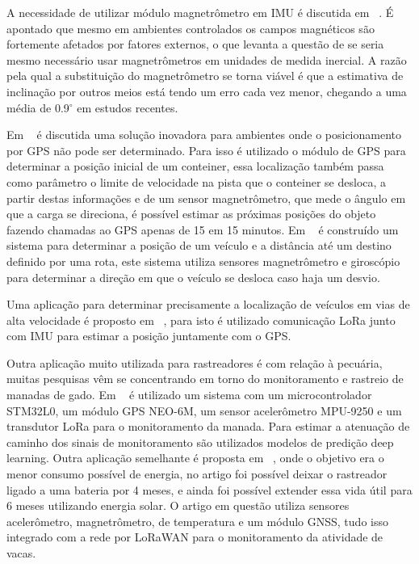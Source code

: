 A necessidade de utilizar módulo magnetrômetro em IMU é discutida em ~\cite{weygers2023}. É apontado que mesmo em ambientes controlados os campos magnéticos são fortemente afetados por fatores externos, o que levanta a questão de se seria mesmo necessário usar magnetrômetros em unidades de medida inercial. A razão pela qual a substituição do magnetrômetro se torna viável é que a estimativa de inclinação por outros meios está tendo um erro cada vez menor, chegando a uma média de 0.9$^{\circ}$ em estudos recentes.

Em ~\cite{huang2023} é discutida uma solução inovadora para ambientes onde o posicionamento por GPS não pode ser determinado. Para isso é utilizado o módulo de GPS para determinar a posição inicial de um conteiner, essa localização também passa como parâmetro o limite de velocidade na pista que o conteiner se desloca, a partir destas informações e de um sensor magnetrômetro, que mede o ângulo em que a carga se direciona, é possível estimar as próximas posições do objeto fazendo chamadas ao GPS apenas de 15 em 15 minutos. Em ~\cite{thuong2010} é construído um sistema para determinar a posição de um veículo e a distância até um destino definido por uma rota, este sistema utiliza sensores magnetrômetro e giroscópio para determinar a direção em que o veículo se desloca caso haja um desvio.

Uma aplicação para determinar precisamente a localização de veículos em vias de alta velocidade é proposto em ~\cite{wu2023}, para isto é utilizado comunicação LoRa junto com IMU para estimar a posição juntamente com o GPS.

Outra aplicação muito utilizada para rastreadores é com relação à pecuária, muitas pesquisas vêm se concentrando em torno do monitoramento e rastreio de manadas de gado. Em ~\cite{baratta2024} é utilizado um sistema com um microcontrolador STM32L0, um módulo GPS NEO-6M, um sensor acelerômetro MPU-9250 e um transdutor LoRa para o monitoramento da manada. Para estimar a atenuação de caminho dos sinais de monitoramento são utilizados modelos de predição deep learning. Outra aplicação semelhante é proposta em ~\cite{longchamp2023}, onde o objetivo era o menor consumo possível de energia, no artigo foi possível deixar o rastreador ligado a uma bateria por 4 meses, e ainda foi possível extender essa vida útil para 6 meses utilizando energia solar. O artigo em questão utiliza sensores acelerômetro, magnetrômetro, de temperatura e um módulo GNSS, tudo isso integrado com a rede por LoRaWAN para o monitoramento da atividade de vacas. 

